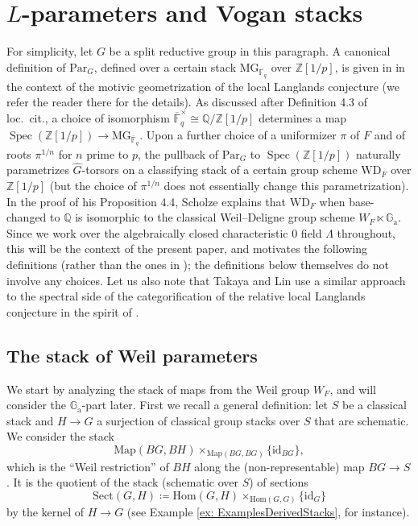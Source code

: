 \documentclass{amsart}
\theoremstyle{definition}
\theoremstyle{remark}
\numberwithin{equation}{section}
\DeclareMathOperator{\Spec}{Spec}
\newcommand{\ov}{\overline}
\newcommand{\Q}{\mathbb{Q}}
\newcommand{\Z}{\mathbb{Z}}
\newcommand{\Hom}{\mathrm{Hom}}
\newcommand{\wh}{\widehat}
\newcommand{\Par}{\mathrm{Par}}
\newcommand{\id}{\mathrm{id}}
\newcommand{\WD}{\mathrm{WD}}
\newcommand{\Ga}{\mathbb{G}_{\mathrm{a}}}
\newcommand{\F}{\mathbb{F}}
\newcommand{\Map}{\mathrm{Map}}
\newcommand{\Sect}{\mathrm{Sect}}
\begin{document}
\section{\texorpdfstring{$L$}{L}-parameters and Vogan stacks}{\label{s: Lparamsandvoganstacks}}

For simplicity, let $G$ be a split reductive group in this paragraph. A canonical definition of $\Par_G$, defined over a certain stack $\mathrm{MG}_{\overline{\F}_q}$ over $\Z[1/p]$, is given in \cite[\S4.1]{ScholzeLLCmotives} in the context of the motivic geometrization of the local Langlands conjecture (we refer the reader there for the details). As discussed after Definition 4.3 of loc.~cit., a choice of isomorphism $\ov{\F}^{\times}_q \cong \Q / \Z[1/p]$ determines a map $\Spec(\Z[1/p]) \rightarrow \mathrm{MG}_{\overline{\F}_q}$. Upon a further choice of a uniformizer $\pi$ of $F$ and of roots $\pi^{1/n}$ for $n$ prime to $p$, the pullback of $\Par_G$ to $\Spec(\Z[1/p])$ naturally parametrizes $\wh{G}$-torsors on a classifying stack of a certain group scheme $\WD_F$ over $\Z[1/p]$ (but the choice of $\pi^{1/n}$ does not essentially change this parametrization).  In the proof of his Proposition 4.4, Scholze explains that $\WD_F$ when base-changed to $\Q$ is isomorphic to the classical Weil--Deligne group scheme $W_F \ltimes \Ga$. Since we work over the algebraically closed characteristic $0$ field $\Lambda$ throughout, this will be the context of the present paper, and motivates the following definitions (rather than the ones in \cite{DHKM, fargues--scholze, HansenMann}); the definitions below themselves do not involve any choices. Let us also note that Takaya and Lin \cite{takayalin} use a similar approach to the spectral side of the categorification of the relative local Langlands conjecture in the spirit of \cite{BZSV}. 

\subsection{The stack of Weil parameters}
We start by analyzing the stack of maps from the Weil group $W_F$, and will consider the $\Ga$-part later. First we recall a general definition: let $S$ be a classical stack and $H\to G$ a surjection of classical group stacks over $S$ that are schematic. We consider the stack
\[
\Map (BG, BH)\times_{\Map (BG, BG)}\{\id_{BG}\},
\]
which is the ``Weil restriction'' of $BH$ along the (non-representable) map $BG\to S$. 
It is the quotient of the stack (schematic over $S$) of sections
\[
\Sect (G, H)\coloneq \Hom (G, H)\times_{\Hom (G, G)}\{\id_G\}
\]
by the kernel of $H\to G$ (see Example \ref{ex: ExamplesDerivedStacks}, for instance). 
\end{document}

